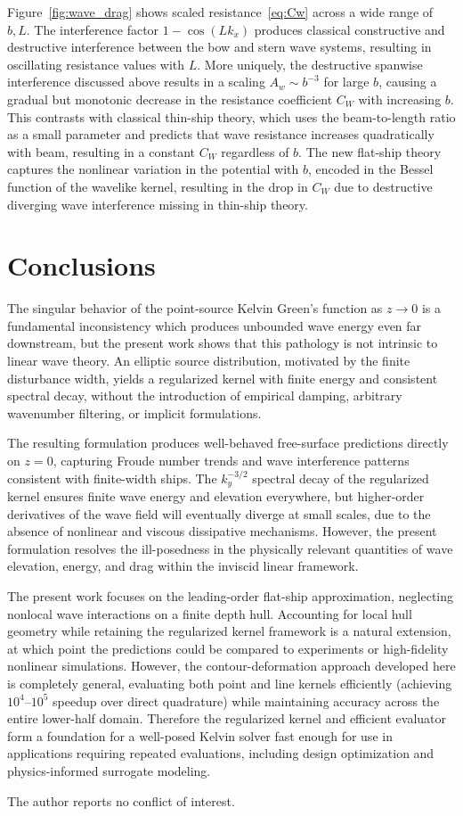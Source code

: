 \documentclass[]{JFM-FLM_Au}
\begin{document}
Figure~\ref{fig:wave_drag} shows scaled resistance~\eqref{eq:Cw} across a wide range of $b,L$. The interference factor $1-\cos(Lk_x)$ produces classical constructive and destructive interference between the bow and stern wave systems, resulting in oscillating resistance values with $L$. More uniquely, the destructive spanwise interference discussed above results in a scaling $A_w\sim b^{-3}$ for large $b$, causing a gradual but monotonic decrease in the resistance coefficient $C_W$ with increasing $b$. This contrasts with classical thin-ship theory, which uses the beam-to-length ratio as a small parameter and predicts that wave resistance increases quadratically with beam, resulting in a constant $C_W$ regardless of $b$. The new flat-ship theory captures the nonlinear variation in the potential with $b$, encoded in the Bessel function of the wavelike kernel, resulting in the drop in $C_W$ due to destructive diverging wave interference missing in thin-ship theory.

\section{Conclusions}

The singular behavior of the point-source Kelvin Green's function as $z\to 0$ is a fundamental inconsistency which produces unbounded wave energy even far downstream, but the present work shows that this pathology is not intrinsic to linear wave theory. An elliptic source distribution, motivated by the finite disturbance width, yields a regularized kernel with finite energy and consistent spectral decay, without the introduction of empirical damping, arbitrary wavenumber filtering, or implicit formulations. 

The resulting formulation produces well-behaved free-surface predictions directly on $z=0$, capturing Froude number trends and wave interference patterns consistent with finite-width ships. The $k_y^{-3/2}$ spectral decay of the regularized kernel ensures finite wave energy and elevation everywhere, but higher-order derivatives of the wave field will eventually diverge at small scales, due to the absence of nonlinear and viscous dissipative mechanisms. However, the present formulation resolves the ill-posedness in the physically relevant quantities of wave elevation, energy, and drag within the inviscid linear framework. 

The present work focuses on the leading-order flat-ship approximation, neglecting nonlocal wave interactions on a finite depth hull. Accounting for local hull geometry while retaining the regularized kernel framework is a natural extension, at which point the predictions could be compared to experiments or high-fidelity nonlinear simulations. However, the contour-deformation approach developed here is completely general, evaluating both point and line kernels efficiently (achieving $10^4$--$10^5$ speedup over direct quadrature) while maintaining accuracy across the entire lower-half domain. Therefore the regularized kernel and efficient evaluator form a foundation for a well-posed Kelvin solver fast enough for use in applications requiring repeated evaluations, including design optimization and physics-informed surrogate modeling.

\begin{bmhead}
The author reports no conflict of interest.
\end{bmhead}



\end{document}
